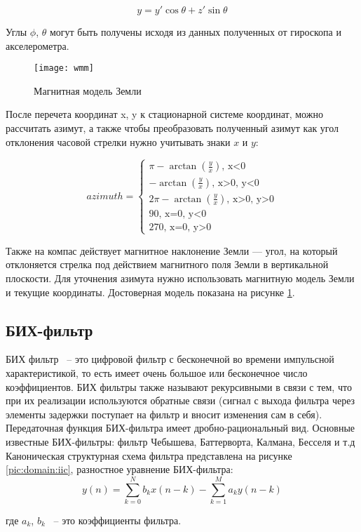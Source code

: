 \begin{equation}
    \label{eq:domain:yMagnetTilt}
    y = y'\cos{\theta}+z'\sin{\theta}
    \end{equation} 

Углы $\phi$, $\theta$ могут быть получены исходя из данных полученных от гироскопа и акселерометра.

\begin{figure}[ht]
    \centering
    \texttt{[image: wmm]}
    \caption{Магнитная модель Земли}
    \label{pic:domain:wmm}
\end{figure}

После перечета координат x, y к стационарной системе координат, можно рассчитать азимут, 
а также чтобы преобразовать полученный азимут как угол отклонения часовой стрелки нужно 
учитывать знаки $x$ и $y$:

\begin{equation}
    azimuth =
    \begin{cases}
      \pi - \arctan\left(\frac{y}{x}\right) \text{, x<0}\\      
      - \arctan\left(\frac{y}{x}\right) \text{, x>0, y<0} \\
      2\pi - \arctan\left(\frac{y}{x}\right) \text{, x>0, y>0} \\
      90 \text{, x=0, y<0} \\
      270 \text{, x=0, y>0}
    \end{cases}
\end{equation}

Также на компас действует магнитное наклонение Земли --- угол, на который отклоняется стрелка под действием 
магнитного поля Земли в вертикальной плоскости. Для уточнения азимута нужно использовать магнитную модель Земли
и текущие координаты.
Достоверная модель показана на рисунке \ref{pic:domain:wmm}.

\subsection{БИХ-фильтр}
БИХ фильтр ~-- это цифровой фильтр с
бесконечной во времени импульсной характеристикой, 
то есть имеет очень большое или бесконечное число коэффициентов. БИХ фильтры также 
называют рекурсивными в связи с тем, что при их
реализации используются обратные связи (сигнал с выхода фильтра через элементы задержки 
поступает на фильтр и вносит изменения сам в себя). 
Передаточная функция БИХ-фильтра имеет дробно-рациональный вид. Основные известные БИХ-фильтры: 
фильтр Чебышева, Баттерворта, Калмана, Бесселя и т.д
Каноническая структурная схема фильтра представлена на рисунке \ref{pic:domain:iic}, разностное уравнение БИХ-фильтра:
\begin{equation}
    \label{eq:domain:IIC}
    y(n) = \sum_{k=0}^{N}b_{k}x(n-k) - \sum_{k=1}^{M}a_{k}y(n-k)
    \end{equation}
    \begin{explanationx}
        \item[где] $a_{k}$, $b_{k}$ ~-- это коэффициенты фильтра.
      \end{explanationx} 

